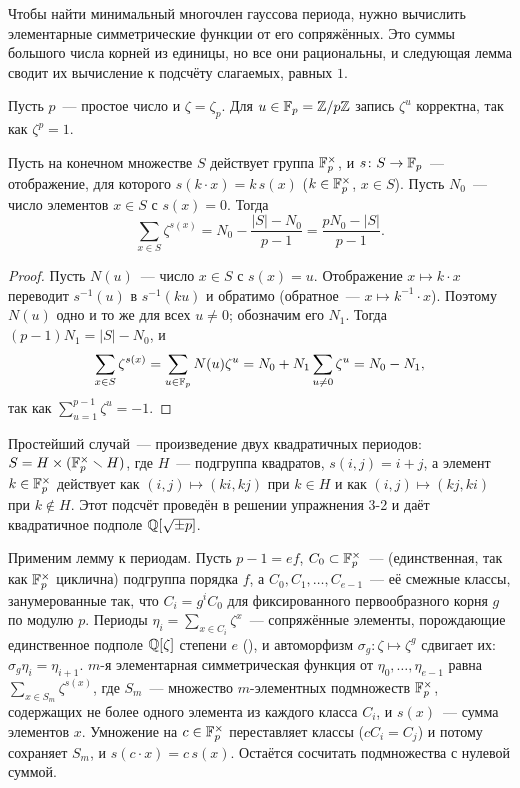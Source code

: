 Чтобы найти минимальный многочлен гауссова периода, нужно вычислить элементарные симметрические функции от его
сопряжённых. Это суммы большого числа корней из единицы, но все они рациональны, и следующая лемма сводит их вычисление к
подсчёту слагаемых, равных $1$.

Пусть $p$~--- простое число и $\zeta=\zeta_p$. Для $u\in\mathbb F_p=\mathbb Z/p\mathbb Z$ запись $\zeta^u$ корректна, так как $\zeta^p=1$.

\begin{lemma}
Пусть на конечном множестве $S$ действует группа $\mathbb F_p^\times$, и $s\colon S\to\mathbb F_p$~--- отображение, для которого
$s(k\cdot x)=k\,s(x)$ ($k\in\mathbb F_p^\times$, $x\in S$). Пусть $N_0$~--- число элементов $x\in S$ с $s(x)=0$. Тогда
\[
\sum_{x\in S}\zeta^{s(x)}=N_0-\frac{|S|-N_0}{p-1}=\frac{pN_0-|S|}{p-1}.
\]
\end{lemma}

\begin{proof}
Пусть $N(u)$~--- число $x\in S$ с $s(x)=u$. Отображение $x\mapsto k\cdot x$ переводит $s^{-1}(u)$ в $s^{-1}(ku)$ и обратимо
(обратное~--- $x\mapsto k^{-1}\cdot x$). Поэтому $N(u)$ одно и то же для всех $u\ne0$; обозначим его $N_1$. Тогда
$(p-1)N_1=|S|-N_0$, и
\[
\sum_{x\in S}\zeta^{s(x)}=\sum_{u\in\mathbb F_p}N(u)\zeta^u=N_0+N_1\sum_{u\ne0}\zeta^u=N_0-N_1,
\]
так как $\sum_{u=1}^{p-1}\zeta^u=-1$.
\end{proof}

Простейший случай~--- произведение двух квадратичных периодов: $S=H\times(\mathbb F_p^\times\smallsetminus H)$, где $H$~--- подгруппа
квадратов, $s(i,j)=i+j$, а элемент $k\in\mathbb F_p^\times$ действует как $(i,j)\mapsto(ki,kj)$ при $k\in H$ и как $(i,j)\mapsto(kj,ki)$ при
$k\notin H$. Этот подсчёт проведён в решении упражнения 3-2 и даёт квадратичное подполе $\mathbb Q[\sqrt{\pm p}]$.

Применим лемму к периодам. Пусть $p-1=ef$, $C_0\subset\mathbb F_p^\times$~--- (единственная, так как $\mathbb F_p^\times$ циклична) подгруппа
порядка $f$, а $C_0,C_1,\dots,C_{e-1}$~--- её смежные классы, занумерованные так, что $C_i=g^iC_0$ для фиксированного
первообразного корня $g$ по модулю $p$. Периоды $\eta_i=\sum_{x\in C_i}\zeta^x$~--- сопряжённые элементы, порождающие
единственное подполе $\mathbb Q[\zeta]$ степени $e$ (), и автоморфизм $\sigma_g\colon\zeta\mapsto\zeta^g$ сдвигает их:
$\sigma_g\eta_i=\eta_{i+1}$. $m$-я элементарная симметрическая функция от $\eta_0,\dots,\eta_{e-1}$ равна
$\sum_{x\in S_m}\zeta^{s(x)}$, где $S_m$~--- множество $m$-элементных подмножеств $\mathbb F_p^\times$, содержащих не более одного
элемента из каждого класса $C_i$, и $s(x)$~--- сумма элементов $x$. Умножение на $c\in\mathbb F_p^\times$ переставляет классы
($cC_i=C_j$) и потому сохраняет $S_m$, и $s(c\cdot x)=c\,s(x)$. Остаётся сосчитать подмножества с нулевой суммой.

